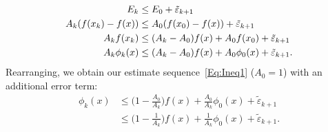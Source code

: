 \documentclass[11pt]{article}
\theoremstyle{plain}
\begin{document}
\begin{subequations}
\begin{align*}
E_k &\leq E_0 + \tilde \varepsilon_{k+1}\\
A_{k}(f(x_{k}) - f(x)) &\leq A_0 (f(x_0) - f(x)) + \tilde \varepsilon_{k+1}\notag\\
A_{k}f(x_{k}) &\leq (A_k -  A_0) f(x) + A_0f(x_0) + \tilde \varepsilon_{k+1}\notag \\
A_k \phi_k(x) &\leq (A_k -A_0) f(x) + A_0 \phi_0(x) + \tilde \varepsilon_{k+1}\label{Eq:EstSeq}.
\end{align*}
\end{subequations}
Rearranging, we obtain our estimate sequence~\eqref{Eq:Ineq1} ($A_0 = 1$) with an additional error term:
\begin{subequations}
\begin{align}
\phi_k(x) &\leq \Big(1 -\frac{A_0}{A_k}\Big) f(x) + \frac{A_0}{A_k} \phi_0(x) + \tilde \varepsilon_{k+1}\\
&\leq \Big(1 - \frac{1}{A_k}\Big)f(x) + \frac{1}{A_k}\phi_0(x)+ \tilde \varepsilon_{k+1}.
\end{align}
\end{subequations}
\end{document}
